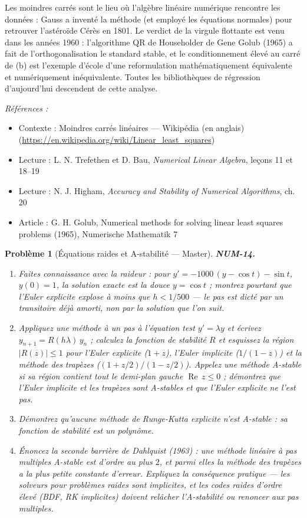 \documentclass[11pt]{article}
\newtheorem{problem}{Problème}
\newenvironment{refs}{\par\small\noindent\emph{Références :}\begin{itemize}\setlength\itemsep{0pt}}{\end{itemize}\normalsize}
\begin{document}
\noindent Les moindres carrés sont le lieu où l'algèbre linéaire numérique
rencontre les données : Gauss a inventé la méthode (et employé les équations normales)
pour retrouver l'astéroïde Cérès en 1801. Le verdict de la virgule flottante est venu
dans les années 1960 : l'algorithme QR de Householder de Gene Golub (1965) a fait de
l'orthogonalisation le standard stable, et le conditionnement élevé au carré de (b) est
l'exemple d'école d'une reformulation mathématiquement équivalente et numériquement
inéquivalente. Toutes les bibliothèques de régression d'aujourd'hui descendent de cette
analyse.

\begin{refs}
\item Contexte : Moindres carrés linéaires --- Wikipédia (en anglais) (\url{https://en.wikipedia.org/wiki/Linear_least_squares})
\item Lecture : L. N. Trefethen et D. Bau, \textit{Numerical Linear Algebra}, leçons 11 et 18--19
\item Lecture : N. J. Higham, \textit{Accuracy and Stability of Numerical Algorithms}, ch. 20
\item Article : G. H. Golub, \og{} Numerical methods for solving linear least squares problems \fg{} (1965), Numerische Mathematik 7
\end{refs}

\bigskip

\begin{problem}[{Équations raides et A-stabilité --- Master}]
\textbf{NUM-14.} \begin{enumerate}
\item[(a)] Faites connaissance avec la raideur : pour
$y' = -1000\,(y - \cos t) - \sin t$, $y(0) = 1$, la solution exacte est la douce
$y = \cos t$ ; montrez pourtant que l'Euler explicite explose à moins que
$h < 1/500$ --- le pas est dicté par un transitoire déjà amorti, non par la solution
que l'on suit.
\item[(b)] Appliquez une méthode à un pas à l'équation test
$y' = \lambda y$ et écrivez $y_{n+1} = R(h\lambda)\,y_n$ ; calculez la fonction de
stabilité $R$ et esquissez la région $|R(z)| \le 1$ pour l'Euler explicite
($1 + z$), l'Euler implicite ($1/(1-z)$) et la méthode des trapèzes
($(1 + z/2)/(1 - z/2)$). Appelez une méthode \textit{A-stable} si sa région contient
tout le demi-plan gauche $\operatorname{Re}\, z \le 0$ ; démontrez que l'Euler
implicite et les trapèzes sont A-stables et que l'Euler explicite ne l'est pas.
\item[(c)] Démontrez qu'\textit{aucune}
méthode de Runge-Kutta explicite n'est A-stable : sa fonction de stabilité est un
polynôme.
\item[(d)] Énoncez la seconde barrière de Dahlquist (1963) : une méthode linéaire à pas
multiples A-stable est d'ordre au plus $2$, et parmi elles la méthode des trapèzes
a la plus petite constante d'erreur. Expliquez la conséquence pratique --- les solveurs
pour problèmes raides sont implicites, et les codes raides d'ordre élevé (BDF, RK
implicites) doivent relâcher l'A-stabilité ou renoncer aux pas multiples.
\end{enumerate}

\end{problem}
\end{document}
